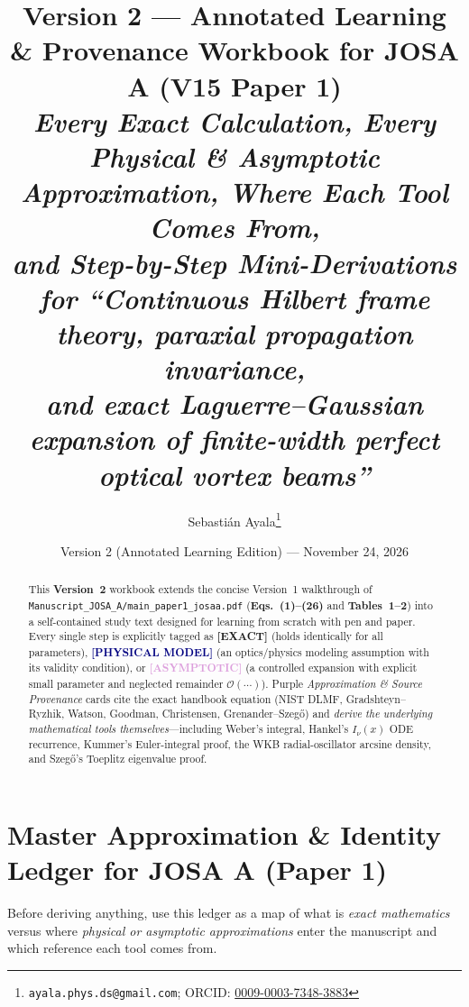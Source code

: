 \documentclass[10pt,letterpaper]{article}
\title{\vspace{-1.0cm}\textbf{\Large Version 2 --- Annotated Learning \& Provenance Workbook for JOSA A (V15 Paper 1)}\\[0.35em]
\large\textit{Every Exact Calculation, Every Physical \& Asymptotic Approximation, Where Each Tool Comes From,\\
and Step-by-Step Mini-Derivations for ``Continuous Hilbert frame theory, paraxial propagation invariance,\\
and exact Laguerre--Gaussian expansion of finite-width perfect optical vortex beams''}}
\author{Sebasti\'an Ayala\thanks{\texttt{ayala.phys.ds@gmail.com}; ORCID: \href{https://orcid.org/0009-0003-7348-3883}{0009-0003-7348-3883}}}
\date{Version 2 (Annotated Learning Edition) --- November 24, 2026}
\newcommand{\tagexact}{\textcolor{forest}{\textbf{[EXACT]}}}
\newcommand{\tagmodel}{\textcolor{navy}{\textbf{[PHYSICAL MODEL]}}}
\newcommand{\tagasymp}{\textcolor{plum}{\textbf{[ASYMPTOTIC]}}}
\numberwithin{equation}{section}
\begin{document}
\maketitle
\thispagestyle{plain}

\begin{abstract}
\noindent This \textbf{Version~2} workbook extends the concise Version~1 walkthrough of \texttt{Manuscript\_JOSA\_A/main\_paper1\_josaa.pdf} (\textbf{Eqs.~(1)--(26)} and \textbf{Tables~1--2}) into a self-contained study text designed for learning from scratch with pen and paper. Every single step is explicitly tagged as \tagexact{} (holds identically for all parameters), \tagmodel{} (an optics/physics modeling assumption with its validity condition), or \tagasymp{} (a controlled expansion with explicit small parameter and neglected remainder $\mathcal{O}(\cdots)$). Purple \emph{Approximation \& Source Provenance} cards cite the exact handbook equation (NIST DLMF, Gradshteyn--Ryzhik, Watson, Goodman, Christensen, Grenander--Szeg\H{o}) and \emph{derive the underlying mathematical tools themselves}---including Weber's integral, Hankel's $I_\nu(x)$ ODE recurrence, Kummer's Euler-integral proof, the WKB radial-oscillator arcsine density, and Szeg\H{o}'s Toeplitz eigenvalue proof.
\end{abstract}

\tableofcontents
\vspace{0.5em}

\section*{Master Approximation \& Identity Ledger for JOSA A (Paper 1)}

Before deriving anything, use this ledger as a map of what is \emph{exact mathematics} versus where \emph{physical or asymptotic approximations} enter the manuscript and which reference each tool comes from.
\end{document}
